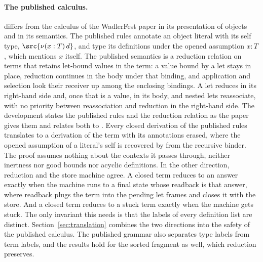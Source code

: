\paragraph{The published calculus.}
\DOTMNF differs from the calculus of the WadlerFest paper in its presentation of objects and in its semantics. The published rules annotate an object literal with its self type, $\src{\nu(x : T)\,d}$, and type its definitions under the opened assumption $x : T$, which mentions $x$ itself. The published semantics is a reduction relation on terms that retains let-bound values in the term: a value bound by a let stays in place, reduction continues in the body under that binding, and application and selection look their receiver up among the enclosing bindings. A let reduces in its right-hand side and, once that is a value, in its body, and nested lets reassociate, with no priority between reassociation and reduction in the right-hand side. The development states the published rules and the reduction relation as the paper gives them and relates both to \DOTMNF. Every closed derivation of the published rules translates to a \DOTMNF derivation of the term with its annotations erased, where the opened assumption of a literal's self is recovered by  from the recursive binder. The proof assumes nothing about the contexts it passes through, neither inertness nor good bounds nor acyclic definitions. In the other direction, reduction and the store machine agree. A closed term reduces to an answer exactly when the machine runs to a final state whose readback is that answer, where readback plugs the term into the pending let frames and closes it with the store. And a closed term reduces to a stuck term exactly when the machine gets stuck. The only invariant this needs is that the labels of every definition list are distinct. Section~\ref{sec:translation} combines the two directions into the safety of the published calculus. The published grammar also separates type labels from term labels, and the results hold for the sorted fragment as well, which reduction preserves.
